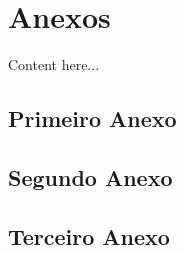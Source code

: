 \chapter*{Anexos}
\hypertarget{anexos}{}  %

\setcounter{section}{0}
\renewcommand{\thesection}{\Alph{section}}

Content here...

\section{Primeiro Anexo}
\section{Segundo Anexo}
\section{Terceiro Anexo}